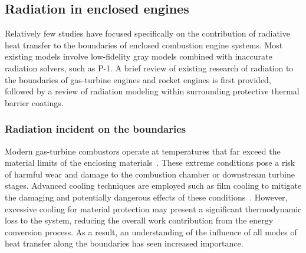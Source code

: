 





\subsection{Radiation in enclosed engines}
Relatively few studies have focused specifically on the contribution of radiative heat transfer to the boundaries of enclosed combustion engine systems. Most existing models involve low-fidelity gray models combined with inaccurate radiation solvers, such as P-1. A brief review of existing research of radiation to the boundaries of gas-turbine engines and rocket engines is first provided, followed by a review of radiation modeling within surrounding protective thermal barrier coatings.

\subsubsection{Radiation incident on the boundaries}

Modern gas-turbine combustors operate at temperatures that far exceed the material limits of the enclosing materials~\cite{Padture2016AdvancedPropulsion}.
These extreme conditions pose a risk of harmful wear and damage to the combustion chamber or downstream turbine stages. Advanced cooling techniques are employed such as film cooling to mitigate the damaging and potentially dangerous effects of these conditions~\cite{Amano2008ThermalSystems}. However, excessive cooling for material protection may present a significant thermodynamic loss to the system, reducing the overall work contribution from the energy conversion process.
As a result, an understanding of the influence of all modes of heat transfer along the boundaries has seen increased importance.

